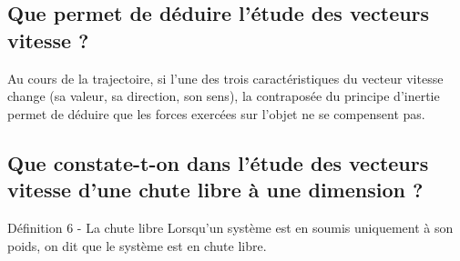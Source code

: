 \documentclass[french, a4paper, 12pt, twocolumn, landscape]{article}
\begin{document}
\subsection{Que permet de déduire l'étude des vecteurs vitesse ? }

Au cours de la trajectoire, si l'une des trois caractéristiques du vecteur vitesse change (sa valeur, sa direction, son sens), la contraposée du principe d'inertie permet de déduire que les forces exercées sur l'objet ne se compensent pas. 


\subsection{Que constate-t-on dans l'étude des vecteurs vitesse d'une chute libre à une dimension ?}


\begin{definition}{Définition 6 - La chute libre}{
	Lorsqu'un système est en soumis uniquement à son poids, on dit que le système  est en chute libre.
}
\end{definition}

\end{document}
